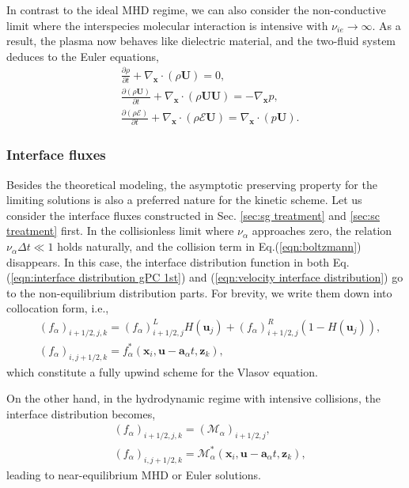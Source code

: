 \documentclass[preprint,3p,12pt,sort&compress]{elsarticle}
\begin{document}
In contrast to the ideal MHD regime, we can also consider the non-conductive limit where the interspecies molecular interaction is intensive with $\nu_{ie} \to \infty$. 
As a result, the plasma now behaves like dielectric material, and the two-fluid system deduces to the Euler equations,
\begin{equation}
\begin{aligned}
&\frac{\partial \rho}{\partial t} + \nabla_{\mathbf{x}} \cdot(\rho \mathbf{U})=0,\\
&\frac{\partial (\rho \mathbf U)}{\partial t} + \nabla_{\mathbf{x}} \cdot\left(\rho \mathbf{U} \mathbf{U}\right)=-\nabla_\mathbf x p ,\\
&\frac{\partial (\rho \mathscr E) }{\partial t}+\nabla_\mathbf x \cdot (\rho \mathscr E \mathbf U) = \nabla_\mathbf x \cdot (p\mathbf U ) .
\end{aligned}
\end{equation}

\subsubsection{Interface fluxes}

Besides the theoretical modeling, the asymptotic preserving property for the limiting solutions is also a preferred nature for the kinetic scheme. 
Let us consider the interface fluxes constructed in Sec. \ref{sec:sg treatment} and \ref{sec:sc treatment} first.
In the collisionless limit where $\nu_\alpha$ approaches zero, the relation $\nu_\alpha \Delta t \ll 1$ holds naturally, and the collision term in Eq.(\ref{eqn:boltzmann}) disappears. 
In this case, the interface distribution function in both Eq.(\ref{eqn:interface distribution gPC 1st}) and (\ref{eqn:velocity interface distribution}) go to the non-equilibrium distribution parts.
For brevity, we write them down into collocation form, i.e.,
\begin{equation}
\begin{aligned}
&(f_\alpha)_{i+1/2,j,k} = 
(f_\alpha)_{i+1/2,j}^L H(\mathbf u_j) + (f_\alpha)_{i+1/2,j}^R (1-H(\mathbf u_j)), \\
&(f_\alpha)_{i,j+1/2,k}=
f^*_{\alpha}(\mathbf{x}_i, \mathbf{u}-\mathbf a_\alpha t,\mathbf z_k),
\end{aligned}
\end{equation}
which constitute a fully upwind scheme for the Vlasov equation.

On the other hand, in the hydrodynamic regime with intensive collisions, the interface distribution becomes,
\begin{equation}
\begin{aligned}
&(f_\alpha)_{i+1/2,j,k} = 
(\mathcal M_\alpha)_{i+1/2,j} , \\
&(f_\alpha)_{i,j+1/2,k}=
\mathcal M^*_{\alpha}(\mathbf{x}_i, \mathbf{u}-\mathbf a_\alpha t,\mathbf z_k),
\end{aligned}
\end{equation}
leading to near-equilibrium MHD or Euler solutions.
\end{document}
